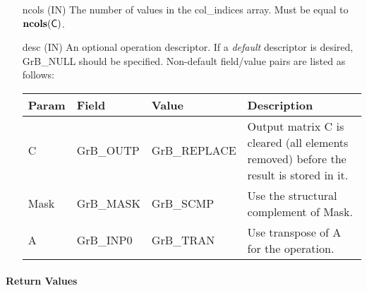 \begin{itemize}[leftmargin=1.1in]
    \item[{\sf ncols}] ({\sf IN}) The number of values in the {\sf col\_indices}
    array.  Must be equal to $\bold{ncols}({\sf C})$.

    \item[{\sf desc}] ({\sf IN}) An optional operation descriptor. If
    a \emph{default} descriptor is desired, {\sf GrB\_NULL} should be
    specified. Non-default field/value pairs are listed as follows:  \\

    \begin{tabular}{lllp{2.5in}}
        Param & Field  & Value & Description \\
        \hline
        {\sf C}    & {\sf GrB\_OUTP} & {\sf GrB\_REPLACE} & Output matrix {\sf C}
        is cleared (all elements removed) before the result is stored in it.\\

        {\sf Mask} & {\sf GrB\_MASK} & {\sf GrB\_SCMP}   & Use the structural
        complement of {\sf Mask}. \\

        {\sf A}    & {\sf GrB\_INP0} & {\sf GrB\_TRAN}   & Use transpose of {\sf A}
        for the operation. \\
    \end{tabular}
\end{itemize}

\paragraph{Return Values}


